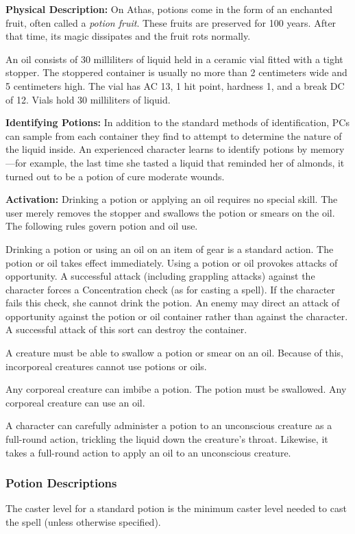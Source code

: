 \textbf{Physical Description:} On Athas, potions come in the form of an enchanted fruit, often called a \emph{potion fruit}. These fruits are preserved for 100 years. After that time, its magic dissipates and the fruit rots normally.

An oil consists of 30 milliliters of liquid held in a ceramic vial fitted with a tight stopper. The stoppered container is usually no more than 2 centimeters wide and 5 centimeters high. The vial has AC 13, 1 hit point, hardness 1, and a break DC of 12. Vials hold 30 milliliters of liquid.

\textbf{Identifying Potions:} In addition to the standard methods of identification, PCs can sample from each container they find to attempt to determine the nature of the liquid inside. An experienced character learns to identify potions by memory---for example, the last time she tasted a liquid that reminded her of almonds, it turned out to be a potion of cure moderate wounds.

\textbf{Activation:} Drinking a potion or applying an oil requires no special skill. The user merely removes the stopper and swallows the potion or smears on the oil. The following rules govern potion and oil use.

Drinking a potion or using an oil on an item of gear is a standard action. The potion or oil takes effect immediately. Using a potion or oil provokes attacks of opportunity. A successful attack (including grappling attacks) against the character forces a Concentration check (as for casting a spell). If the character fails this check, she cannot drink the potion. An enemy may direct an attack of opportunity against the potion or oil container rather than against the character. A successful attack of this sort can destroy the container.

A creature must be able to swallow a potion or smear on an oil. Because of this, incorporeal creatures cannot use potions or oils.

Any corporeal creature can imbibe a potion. The potion must be swallowed. Any corporeal creature can use an oil.

A character can carefully administer a potion to an unconscious creature as a full-round action, trickling the liquid down the creature's throat. Likewise, it takes a full-round action to apply an oil to an unconscious creature.

\subsubsection{Potion Descriptions}
The caster level for a standard potion is the minimum caster level needed to cast the spell (unless otherwise specified).

